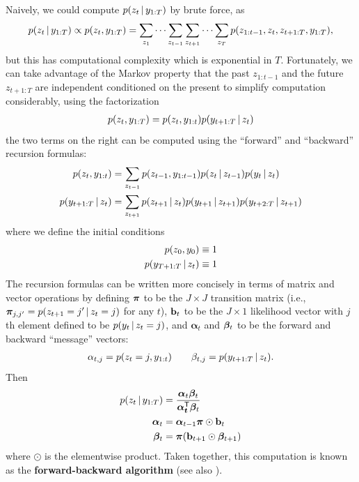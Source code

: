 Naively, we could compute $p(z_t \, \vert \, y_{1:T})$ by brute force, as
\begin{align}
p(z_t \, \vert \, y_{1:T}) \propto p(z_t, y_{1:T}) = \sum_{z_1} \dots \sum_{z_{t-1}} \sum_{z_{t+1}} \dots \sum_{z_T} p(z_{1:t-1},z_t,z_{t+1:T}, y_{1:T}),
\end{align}
but this has computational complexity which is exponential in $T$.
Fortunately, we can take advantage of the Markov property that the past
$z_{1:t-1}$ and the future $z_{t+1:T}$ are independent conditioned on
the present to simplify computation considerably, using the
factorization
\begin{align}
  p(z_{t}, y_{1:T}) = p(z_{t}, y_{1:t}) p(y_{t+1:T}
  \, \vert \, z_t)
\end{align}
the two terms on the right
can be computed using the ``forward'' and ``backward'' recursion formulas:
\begin{align}
  \label{eq:forward-step} p(z_{t}, y_{1:t}) &= \sum_{z_{t-1}} p(z_{t-1}, y_{1:t-1}) p(z_{t}
                      \, \vert \, z_{t-1}) p(y_t \, \vert \, z_t) \\
  \label{eq:backward-step} p(y_{t+1:T} \, \vert \, z_{t}) &= \sum_{z_{t+1}} p(z_{t+1} \, \vert \, z_{t})
  p(y_{t+1} \, \vert \, z_{t+1}) p(y_{t+2:T} \, \vert \, z_{t+1})
\end{align}
where we define the initial conditions
\begin{align}
  p(z_0, y_0) &\equiv 1 \\
  p(y_{T+1:T} \, \vert \, z_{t}) & \equiv 1
\end{align}
The recursion formulas can be written more concisely in terms of
matrix and vector operations by defining $\boldsymbol{\pi}$ to be the $J \times J$
transition matrix (i.e., $\boldsymbol{\pi}_{j,j'} = p(z_{t+1} = j' \, \vert \, z_{t} =
j)$ for any $t$), $\mathbf{b}_t$ to be the $J \times 1$ likelihood vector
with $j$th element defined to be $p(y_t \, \vert \, z_t = j)$, and
$\boldsymbol{\alpha}_t$ and $\boldsymbol{\beta}_t$ to be the forward and backward ``message'' vectors:
\begin{align}
  \alpha_{t,j} = p(z_t = j, y_{1:t}) \qquad \beta_{t,j} = p(y_{t+1:T}
  \, \vert \, z_t).
\end{align}
Then
\begin{align}
  p(z_t \, \vert \, y_{1:T}) &= \frac{\boldsymbol{\alpha}_{t}
  \boldsymbol{\beta}_t}{\boldsymbol{\alpha_t}^{\sf T}\boldsymbol{\beta}_{t}} \\
  \boldsymbol{\alpha}_{t} &= \boldsymbol{\alpha}_{t-1} \boldsymbol{\pi} \odot
                            \mathbf{b}_t \\
  \boldsymbol{\beta}_t &= \boldsymbol{\pi} (\mathbf{b}_{t+1} \odot \boldsymbol{\beta}_{t+1})
\end{align}
where $\odot$ is the elementwise product.  Taken together, this
computation is known as the {\bf forward-backward algorithm} (see also
\citet{rabiner1986introduction}).

